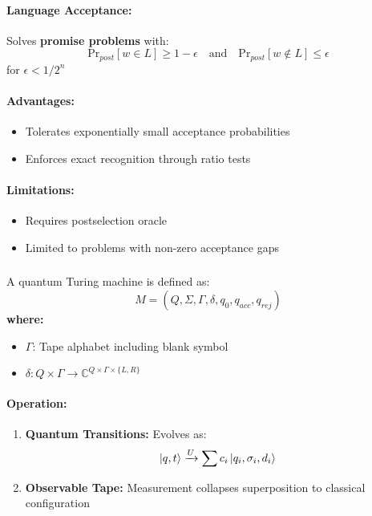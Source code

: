 \paragraph{Language Acceptance:}
Solves \textbf{promise problems} with:
\[
\text{Pr}_{post}[w \in L] \geq 1 - \epsilon \quad \text{and} \quad \text{Pr}_{post}[w \notin L] \leq \epsilon
\]
for $\epsilon < 1/2^n$

\paragraph{Advantages:}
\begin{itemize}
    \item Tolerates exponentially small acceptance probabilities
    \item Enforces exact recognition through ratio tests
\end{itemize}

\paragraph{Limitations:}
\begin{itemize}
    \item Requires postselection oracle
    \item Limited to problems with non-zero acceptance gaps
\end{itemize}

\subsubsection{}
\label{subsec:qtm}

\begin{definition}
A quantum Turing machine is defined as:
\[
M = (Q, \Sigma, \Gamma, \delta, q_0, q_{acc}, q_{rej})
\]
\textbf{where:}
\begin{itemize}
    \item $\Gamma$: Tape alphabet including blank symbol
    \item $\delta: Q \times \Gamma \rightarrow \mathbb{C}^{Q \times \Gamma \times \{L,R\}}$
\end{itemize}
\end{definition}

\paragraph{Operation:}
\begin{enumerate}
    \item \textbf{Quantum Transitions:} Evolves as:
    \[
    \ket{q,t} \xrightarrow{U} \sum c_i \ket{q_i,\sigma_i,d_i}
    \]
    \item \textbf{Observable Tape:} Measurement collapses superposition to classical configuration
\end{enumerate}

